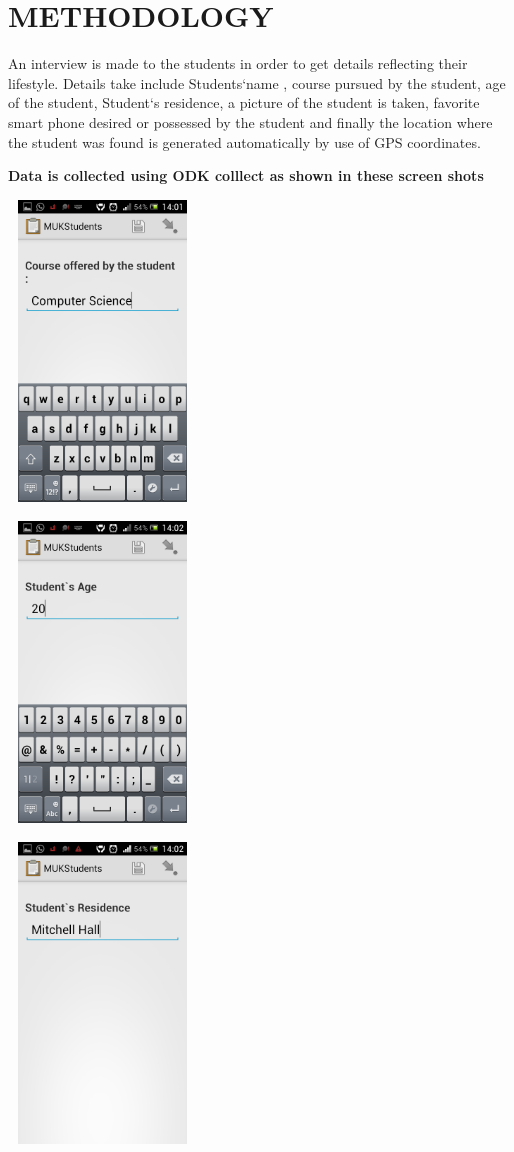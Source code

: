 \documentclass{article}
\begin{document}
\section{METHODOLOGY}
An interview is made to the students in order to get details reflecting their lifestyle. Details take include Students`name , course pursued by the student, age of the student, Student`s residence, a picture of the student is taken, favorite smart phone desired or possessed by the student and finally the location where the student was found is generated automatically by use of GPS coordinates.

\textbf{Data is collected using ODK colllect as shown in these screen shots}
\graphicspath{{ODKprojectReport/}}
\includegraphics[width = 5cm , height = 8cm ]{course}
\graphicspath{{ODKprojectReport/}}
\includegraphics[width = 5cm , height = 8cm ]{age}
\graphicspath{{ODKprojectReport/}}
\includegraphics[width = 5cm , height = 8cm ]{residence}
\end{document}
